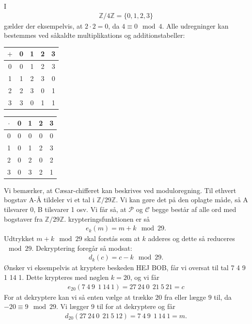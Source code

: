 \documentclass[12pt]{article}
\begin{document}
\begin{exa}
I 
\begin{align*}
\mathbb{Z}/4\mathbb{Z} = \{0,1,2,3\}
\end{align*}
gælder der eksempelvis, at $2\cdot 2 = 0$, da $4\equiv 0 \mod{4}$. Alle udregninger kan bestemmes ved såkaldte multiplikations og additionstabeller:
\begin{center}
\begin{tabular}{c|cccc}
$+$ & 0 & 1 & 2 & 3\\
\hline
0 & 0 & 1 & 2 & 3\\
1 & 1 & 2 & 3 & 0\\
2 & 2 & 3 & 0 & 1\\
3 & 3 & 0 & 1 & 1\\

\end{tabular}
\hspace{1cm}
\begin{tabular}{c|cccc}
$\cdot $ & 0 & 1 & 2 & 3\\
\hline
0 & 0 & 0 & 0 & 0\\
1 & 0 & 1 & 2 & 3\\
2 & 0 & 2 & 0 & 2\\
3 & 0 & 3 & 2 & 1\\ 
\end{tabular}
\end{center}

\end{exa}

\begin{exa}
Vi bemærker, at Cæsar-chifferet kan beskrives ved moduloregning. Til ethvert bogstav A-Å tildeler vi et tal i $\mathbb{Z}/29\mathbb{Z}$. Vi kan gøre det på den oplagte måde, så A tilsvarer $0$, B tilsvarer 1 osv. 
Vi får så, at $\mathscr{P}$ og $\mathscr{C}$ begge består af alle ord med bogstaver fra $\mathbb{Z}/29\mathbb{Z}$. 
krypteringsfunktionen er så 
\begin{align*}
e_k(m) = m + k \mod{29}.
\end{align*} 
Udtrykket $m + k \mod{29}$ skal forstås som at $k$ adderes og dette så reduceres $\mod{29}$. 
Dekryptering foregår så modsat:
\begin{align*}
d_{k}(c) = c - k \mod{29}. 
\end{align*}
Ønsker vi eksempelvis at kryptere beskeden HEJ BOB, får vi oversat til tal 7 4 9 1 14 1. 
Dette krypteres med nøglen $k = 20$, og vi får
\begin{align*}
e_{20}(7\ 4\ 9\ \ 1\ 14\ 1) = 27\ 24\ 0\ \ 21 \ 5 \ 21  = c
\end{align*}
For at dekryptere kan vi så enten vælge at trække $20$ fra eller lægge $9$ til, da $-20 \equiv 9 \mod{29}$. Vi lægger $9$ til for at dekryptere og får
\begin{align*}
d_{20}(27\ 24\ 0 \ \ 21\ 5\ 12 ) = 7\ 4 \ 9 \ \ 1\ 14\ 1 = m.
\end{align*}
\end{exa}
\end{document}
